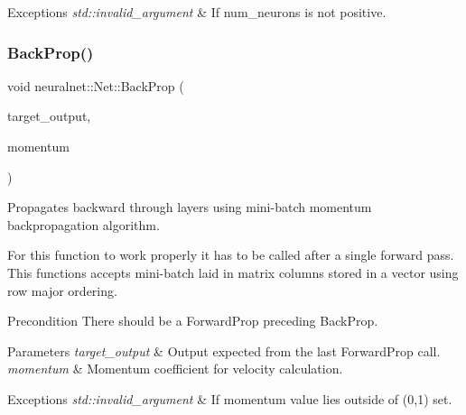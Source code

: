 \begin{DoxyExceptions}{Exceptions}
{\em std\+::invalid\+\_\+argument} & If num\+\_\+neurons is not positive. \\
\hline
\end{DoxyExceptions}
\mbox{\label{classneuralnet_1_1Net_af6d95fdc4ccdc37d7150668fc74e8a36}} 
\subsubsection{\texorpdfstring{Back\+Prop()}{BackProp()}}
{\footnotesize\ttfamily void neuralnet\+::\+Net\+::\+Back\+Prop (\begin{DoxyParamCaption}\item[{const std\+::vector$<$ double $>$ \&}]{target\+\_\+output,  }\item[{double}]{momentum }\end{DoxyParamCaption})\hspace{0.3cm}{\ttfamily [virtual]}}



Propagates backward through layers using mini-\/batch momentum backpropagation algorithm. 

For this function to work properly it has to be called after a single forward pass. This functions accepts mini-\/batch laid in matrix columns stored in a vector using row major ordering.

\begin{DoxyPrecond}{Precondition}
There should be a Forward\+Prop preceding Back\+Prop. 
\end{DoxyPrecond}

\begin{DoxyParams}{Parameters}
{\em target\+\_\+output} & Output expected from the last Forward\+Prop call. \\
\hline
{\em momentum} & Momentum coefficient for velocity calculation. \\
\hline
\end{DoxyParams}

\begin{DoxyExceptions}{Exceptions}
{\em std\+::invalid\+\_\+argument} & If momentum value lies outside of (0,1) set. \\
\hline
\end{DoxyExceptions}
\mbox{\label{classneuralnet_1_1Net_a0129f8d6a5e624665cd3922fef79493d}} 
